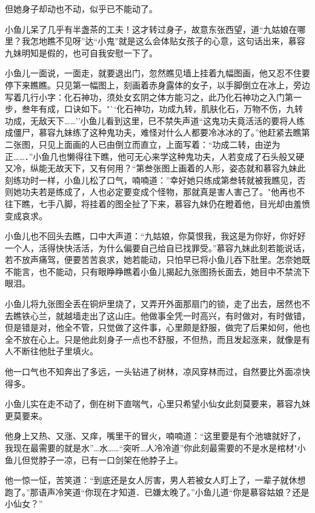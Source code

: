 \documentclass[12pt,oneside]{book}
\begin{document}
但她身子却动也不动，似乎已不能动了。

小鱼儿呆了几乎有半盏茶的工夫！这才转过身子，故意东张西望，道``九姑娘在哪里？我怎地瞧不见呀''达``小鬼''就是这么会体贴女孩子的心意，这句话出来，慕容九妹明知是假的，也可自我安慰一下了。

小鱼儿一面说，一面走，就要退出门，忽然瞧见墙上挂着九幅图画，他又忍不住要停下来瞧瞧。只见第一幅图上，刻画着赤身露体的女子，以手脚倒立在冰上，旁边写着几行小字：化石神功，须处女玄阴之体方能习之，此乃化石神功之入门第一步，叁年有成，口诀如下。"``化石神功，功成九转，肌肤化石，万物不伤，九转功成，无敌天下\ldots\ldots{}''小鱼儿看到这里，巳不禁失声道``这鬼功夫竟活活的要将人练成僵尸，慕容九妹练了这种鬼功夫，难怪对什么人都要冷冰冰的了。''他赶紧去瞧第二张图，只见上面画的人已由倒立而直立，上面写着：``功成二转，由逆为正\ldots\ldots．''小鱼几也懒得往下瞧，他可无心来学这种鬼功夫，人若变成了石头般又硬又冷，纵能无故天下，又有何用？``第叁张图上画着的人形，姿态就和慕容九妹此刻练功时一样，小鱼儿松了口气，喃喃道：''幸好她只练成第叁转就被我瞧见，否则她功夫若是练成了，人也必定要变成个怪物，那就真是害人害己了。"他再也不往下瞧，七手八脚，将挂着的图全扯了下来，慕容九妹仍在瞪着他，目光却由羞愤变成哀求。

小鱼儿也不回头去瞧，口中大声道：``九姑娘，你莫恨我，我这是为你好，你好好一个人，活得快快活活，为什么偏要自己给自已找罪受。''慕容九妹此刻若能说话，若不放声痛驾，便要苦苦哀求，她若能动，只怕早已将小鱼儿吞下肚里。怎奈她既不能言，也不能动，只有眼睁睁瞧着小鱼儿揭起九张图扬长面去，她目中不禁流下眼泪。

小鱼儿将九张图全丢在铜炉里烧了，又弄开外面那扇门的锁，走了出去，居然也不去瞧铁心兰，就越墙走出了这山庄。他做事全凭一时高兴，有时做对，有时做错，但是错是对，他全不管，只觉做了这件事，心里颇是舒服，做完了后果如何，他也全不放在心上。只是他此刻身子一点也不舒服，不但热，而且发起涨来，就像是有人不断往他肚子里填火。

他一口气也不知奔出了多远，一头钻进了树林，凉风穿林而过，自然要比外面凉快得多。

小鱼儿实在走不动了，倒在树下直喘气，心里只希望小仙女此刻莫要来，慕容九妹更莫要来。

他身上又热、又涨、又痒，嘴里干的冒火，喃喃道：``这里要是有个池塘就好了，我现在最需要的就是水''\ldots 水\ldots\ldots{}``突听\ldots 人冷冷道''你此刻最需要的不是水是棺材"小鱼儿但觉脖子一凉，已有一口剑架在他脖子上。

他一惊一怔，苦笑道：``到底还是女人厉害，男人若被女人盯上了，一辈子就休想跑了。''那语声冷笑道``你现在才知道．已嫌太晚了。''小鱼儿道``你是慕容姑娘？还是小仙女？''
\end{document}
